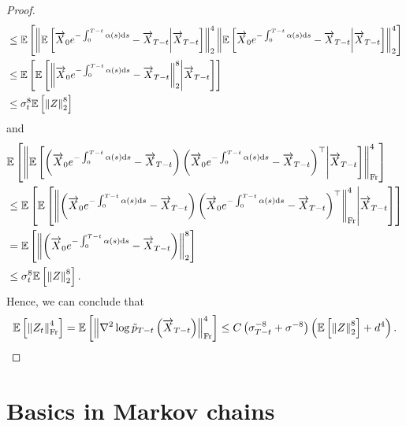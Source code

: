 \documentclass[english,graybox,envcountchap,envcountsame,sectrefs,shortlabels]{svmono}
\theoremstyle{style}
\renewenvironment{keywords}{\textit{\bf Keywords: } \sffamily }{}
\newcommand{\eqsp}{}
\begin{document}
\begin{proof}
\begin{align*}
    & \leq \mathbb{E} \left[\left\| \mathbb{E} \left[ \overrightarrow X_0 e^{- \int_0^{T-t} \alpha (s) \mathrm{d} s} - \overrightarrow X_{T-t} \middle| \overrightarrow X_{T-t}\right] \right\|^4_2 \left\| \mathbb{E} \left[    \overrightarrow X_0 e^{- \int_0^{T-t} \alpha (s) \mathrm{d} s} - \overrightarrow X_{T-t}  \middle| \overrightarrow X_{T-t}   \right] \right\|^4_{2} \right] \\
    & \leq \mathbb{E} \left[ \mathbb{E} \left[ \left\|  \overrightarrow X_0 e^{- \int_0^{T-t} \alpha (s) \mathrm{d} s} - \overrightarrow X_{T-t} \right\|^8_2 \middle| \overrightarrow X_{T-t}\right] \right]  \\
    & \leq \sigma_t^8 \mathbb{E} \left[ \left\|   Z \right\|^8_2 \right]
\end{align*}
and
\begin{align*}
    & \mathbb{E } \left[ \left\| \mathbb{E} \left[ \left(\ora X_0 e^{- \int_0^{T-t} \alpha (s) \rmd s} - \ora X_{T-t} \right) \left(\ora X_0 e^{- \int_0^{T-t} \alpha (s) \rmd s} - \ora X_{T-t} \right)^\top \middle| \ora X_{T-t} \right]  \right\|^4_{\mathrm{Fr}} \right] \\
    & \leq \mathbb{E } \left[  \mathbb{E} \left[ \left\| \left(\ora X_0 e^{- \int_0^{T-t} \alpha (s) \rmd s} - \ora X_{T-t} \right)
    \left(\ora X_0 e^{- \int_0^{T-t} \alpha (s) \rmd s} - \ora X_{T-t} \right)^\top  \right\|^4_{\mathrm{Fr}}  \middle| \ora X_{T-t} \right]  \right] \\
    & =  \mathbb{E} \left[ \left\| \left(\ora X_0 e^{- \int_0^{T-t} \alpha (s) \rmd s} - \ora X_{T-t} \right) \right\|^8_{\rm 2}  \right]   \\
    & \leq \sigma_t^8 \mathbb{E} \left[ \left\|   Z \right\|^8_2 \right]\eqsp.
\end{align*}
Hence, we can conclude that
\begin{align*}
    \mathbb{E} \left[ \left\| Z_t \right\|^4_{\mathrm{Fr}} \right] = \mathbb{E} \left[ \left\| \nabla^2 \log \tilde p_{T-t} \left( \ora X_{T-t} \right) \right\|^4_{\mathrm{Fr}} \right] \leq C \left(\sigma^{-8}_{T-t}+ \sigma^{-8}\right) \left( \mathbb{E} \left[ \left\|   Z \right\|^8_2 \right] + d^4 \right)\eqsp.
\end{align*}
\end{proof}






\chapter{Basics in Markov chains}
\minitoc
\end{document}
